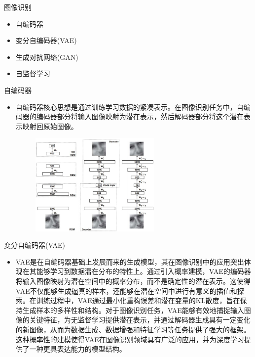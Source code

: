 \documentclass[UTF8]{beamer}
\begin{document}
\begin{frame}{图像识别}
    \begin{itemize}
        \item 自编码器
        \item 变分自编码器(VAE)
        \item 生成对抗网络(GAN)
        \item 自监督学习
    \end{itemize}
\end{frame}

\begin{frame}{自编码器}
    \begin{itemize}
        \item 自编码器核心思想是通过训练学习数据的紧凑表示。在图像识别任务中，自编码器的编码器部分将输入图像映射为潜在表示，然后解码器部分将这个潜在表示映射回原始图像。


        \begin{figure}[H]
            \centering
            \includegraphics[width=0.6\textwidth]{img//2-Image Recognition/1.jpg}
        \end{figure}
    \end{itemize}  
\end{frame}

\begin{frame}{变分自编码器(VAE)}
    \begin{itemize}
        \item VAE是在自编码器基础上发展而来的生成模型，其在图像识别中的应用突出体现在其能够学习到数据潜在分布的特性上。通过引入概率建模，VAE的编码器将输入图像映射为潜在空间中的概率分布，而不是确定性的潜在表示。这使得VAE不仅能够生成逼真的样本，还能够在潜在空间中进行有意义的插值和探索。在训练过程中，VAE通过最小化重构误差和潜在变量的KL散度，旨在保持生成样本的多样性和结构。对于图像识别任务，VAE能够有效地捕捉输入图像的关键特征，为无监督学习提供潜在表示，并通过解码器生成具有一定变化的新图像，从而为数据生成、数据增强和特征学习等任务提供了强大的框架。这种概率性的建模使得VAE在图像识别领域具有广泛的应用，并为深度学习提供了一种更具表达能力的模型结构。
    \end{itemize}
\end{frame}
\end{document}
